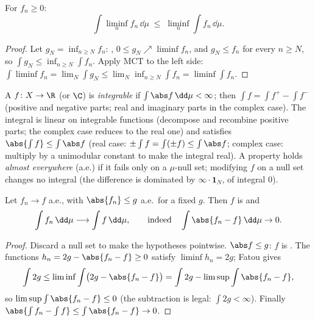 \begin{theorem}\label{thm:b3:lebesgue:fatou}
For  $f_n \geq 0$:
\[
\int \liminf_n f_n \,\dd\mu \;\leq\; \liminf_n \int
f_n\,\dd\mu .
\]
\end{theorem}

\begin{proof}
Let $g_N = \inf_{n\geq N}f_n$: , $0 \leq g_N \nearrow
\liminf f_n$, and $g_N \leq f_n$ for every $n \geq N$, so
$\int g_N \leq \inf_{n \geq N}\int f_n$. Apply MCT to the left
side: $\int\liminf f_n = \lim_N\int g_N \leq
\lim_N\inf_{n\geq N}\int f_n = \liminf\int f_n$.
\end{proof}

\begin{definition}\label{def:b3:lebesgue:l1}
A  $f \colon X \to \R$ (or $\C$) is
\emph{integrable} if $\int\abs
f\,\dd\mu < \infty$; then $\int f = \int f^+ - \int f^-$
(positive and negative parts; real and imaginary parts in the
complex case). The integral is linear on integrable functions
(decompose and recombine positive parts; the complex case
reduces to the real one) and satisfies $\abs{\int f} \leq
\int\abs f$ (real case: $\pm\int f = \int(\pm f) \leq
\int\abs f$; complex case: multiply by a unimodular constant
to make the integral real). A property holds \emph{almost
everywhere} (a.e.) if it fails only on
a $\mu$-null set; modifying $f$ on a null set changes no
integral (the difference is dominated by $\infty\cdot\mathbf
1_N$, of integral $0$).
\end{definition}

\begin{theorem}\label{thm:b3:lebesgue:dct}
Let $f_n \to f$ a.e., with $\abs{f_n} \leq g$ a.e.\ for a fixed
\emph{} $g$. Then $f$ is  and
\[
\int f_n\,\dd\mu \longrightarrow \int f\,\dd\mu,
\qquad\text{indeed}\quad \int\abs{f_n - f}\,\dd\mu \to 0 .
\]
\end{theorem}

\begin{proof}
Discard a null set to make the hypotheses pointwise. $\abs f
\leq g$: $f$ is . The functions $h_n = 2g - \abs{f_n
- f} \geq 0$ satisfy $\liminf h_n = 2g$; Fatou gives
\[
\int 2g \leq \liminf\int\bigl(2g - \abs{f_n - f}\bigr)
= \int 2g - \limsup\int\abs{f_n - f},
\]
so $\limsup\int\abs{f_n - f} \leq 0$ (the subtraction is legal:
$\int 2g < \infty$). Finally $\abs{\int f_n - \int f} \leq
\int\abs{f_n - f} \to 0$.
\end{proof}

